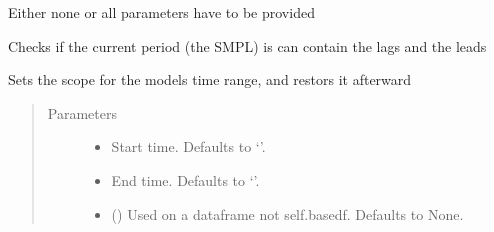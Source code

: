 \documentclass[letterpaper,10pt,english]{sphinxmanual}
\begin{document}
\begin{fulllineitems}
\begin{fulllineitems}
\sphinxAtStartPar
Either none or all parameters have to be provided

\end{fulllineitems}


\begin{fulllineitems}
\label{\detokenize{index:modelclass.BaseModel.check_sim_smpl}}
\pysigstartsignatures
{}
\pysigstopsignatures
\sphinxAtStartPar
Checks if the current period (the SMPL) is can contain the lags and the leads

\end{fulllineitems}


\begin{fulllineitems}
\label{\detokenize{index:modelclass.BaseModel.set_smpl}}
\pysigstartsignatures
{}
\pysigstopsignatures
\sphinxAtStartPar
Sets the scope for the models time range, and restors it afterward
\begin{quote}\begin{description}
\item[{Parameters}] \leavevmode\begin{itemize}
\item {} 
\sphinxAtStartPar
{} \textendash{} Start time. Defaults to ‘’.

\item {} 
\sphinxAtStartPar
{} \textendash{} End time. Defaults to ‘’.

\item {} 
\sphinxAtStartPar
{} (\sphinxstyleliteralemphasis{\sphinxupquote{, }}) \textendash{} Used on a dataframe not self.basedf. Defaults to None.


\end{itemize}
\end{description}
\end{quote}
\end{fulllineitems}
\end{fulllineitems}
\end{document}
